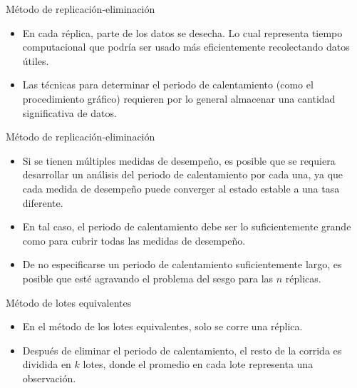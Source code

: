 \begin{frame}{Método de replicación-eliminación}
    \begin{itemize}
        \item En cada réplica, parte de los datos se desecha. Lo cual representa tiempo computacional que podría ser usado más eficientemente recolectando datos útiles.
        \item Las técnicas para determinar el periodo de calentamiento (como el procedimiento gráfico) requieren por lo general almacenar una cantidad significativa de datos.
    \end{itemize}
\end{frame}

\begin{frame}{Método de replicación-eliminación}
    \begin{itemize}
        \item Si se tienen múltiples medidas de desempeño, es posible que se requiera desarrollar un análisis del periodo de calentamiento por cada una, ya que cada medida de desempeño puede converger al estado estable a una tasa diferente.
        \item En tal caso, el periodo de calentamiento debe ser lo suficientemente grande como para cubrir todas las medidas de desempeño.
        \item De no especificarse un periodo de calentamiento suficientemente largo, es posible que esté agravando el problema del sesgo para las $n$ réplicas.
    \end{itemize}
\end{frame}

\begin{frame}{Método de lotes equivalentes}
    \begin{itemize}
        \item En el método de los lotes equivalentes, solo se corre una réplica.
        \item Después de eliminar el periodo de calentamiento, el resto de la corrida es dividida en $k$ lotes, donde el promedio en cada lote representa una observación.
    \end{itemize}
\end{frame}


